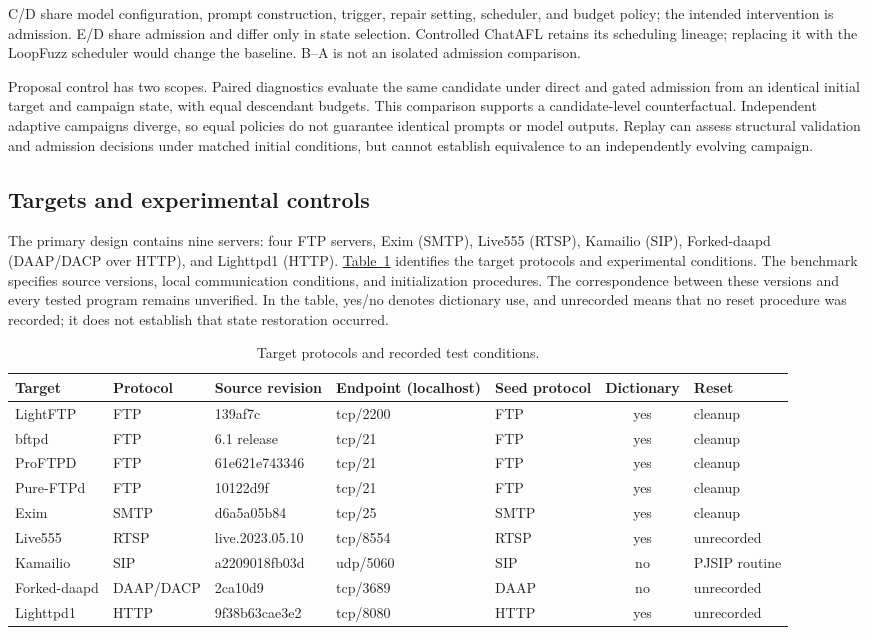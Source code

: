 \documentclass[final,5p,times,number]{elsarticle}
\newcommand{\namedref}[2]{\hyperref[#2]{#1~\ref*{#2}}}
\begin{document}
C/D share model configuration, prompt construction, trigger, repair setting, scheduler, and budget policy; the intended intervention is admission. E/D share admission and differ only in state selection. Controlled ChatAFL retains its scheduling lineage; replacing it with the LoopFuzz scheduler would change the baseline. B--A is not an isolated admission comparison.

Proposal control has two scopes. Paired diagnostics evaluate the same candidate under direct and gated admission from an identical initial target and campaign state, with equal descendant budgets. This comparison supports a candidate-level counterfactual. Independent adaptive campaigns diverge, so equal policies do not guarantee identical prompts or model outputs. Replay can assess structural validation and admission decisions under matched initial conditions, but cannot establish equivalence to an independently evolving campaign.

\subsection{Targets and experimental controls}
The primary design contains nine servers: four FTP servers, Exim (SMTP), Live555 (RTSP), Kamailio (SIP), Forked-daapd (DAAP/DACP over HTTP), and Lighttpd1 (HTTP). \namedref{Table}{tab:targets} identifies the target protocols and experimental conditions. The benchmark specifies source versions, local communication conditions, and initialization procedures. The correspondence between these versions and every tested program remains unverified. In the table, yes/no denotes dictionary use, and unrecorded means that no reset procedure was recorded; it does not establish that state restoration occurred.

\begin{table}[!tbp]
\centering\small
\caption{Target protocols and recorded test conditions.}
\label{tab:targets}
\begin{tabular*}{\textwidth}{@{\extracolsep{\fill}}lllllcl@{}}
\toprule
Target & Protocol & Source revision & Endpoint (localhost) & Seed protocol & Dictionary & Reset \\
\midrule
LightFTP & FTP & 139af7c & tcp/2200 & FTP & yes & cleanup \\
bftpd & FTP & 6.1 release & tcp/21 & FTP & yes & cleanup \\
ProFTPD & FTP & 61e621e743346 & tcp/21 & FTP & yes & cleanup \\
Pure-FTPd & FTP & 10122d9f & tcp/21 & FTP & yes & cleanup \\
Exim & SMTP & d6a5a05b84 & tcp/25 & SMTP & yes & cleanup \\
Live555 & RTSP & live.2023.05.10 & tcp/8554 & RTSP & yes & unrecorded \\
Kamailio & SIP & a2209018fb03d & udp/5060 & SIP & no & PJSIP routine \\
Forked-daapd & DAAP/DACP & 2ca10d9 & tcp/3689 & DAAP & no & unrecorded \\
Lighttpd1 & HTTP & 9f38b63cae3e2 & tcp/8080 & HTTP & yes & unrecorded \\
\bottomrule
\end{tabular*}
\end{table}
\end{document}
